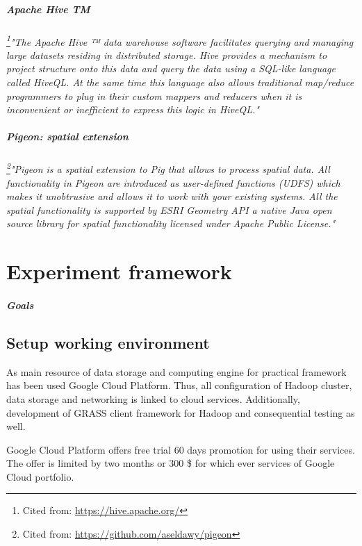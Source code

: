 \documentclass[a4paper,12pt,oneside]{report}
\begin{document}
	\paragraph{Apache Hive TM}
\textit{\footnote{Cited from: \url{https://hive.apache.org/}}"The Apache Hive ™ data warehouse software 
facilitates querying and managing large datasets residing in distributed storage. Hive provides a mechanism 
to project structure onto this data and query the data using a SQL-like language called HiveQL. At the same
time this language also allows traditional map/reduce programmers to plug in their custom mappers and 
reducers when it is inconvenient or inefficient to express this logic in HiveQL."}
	\paragraph{Pigeon: spatial extension}
\textit{\footnote{Cited from: \url{https://github.com/aseldawy/pigeon}}"Pigeon is a spatial extension to 
Pig that allows to process spatial data. All functionality in Pigeon are introduced as user-defined 
functions (UDFS) which makes it unobtrusive and allows it to work with your existing systems. All the 
spatial functionality is supported by ESRI Geometry API a native Java open source library for spatial 
functionality licensed under Apache Public License."}



	
\newpage
\chapter*{Experiment framework}
\paragraph{Goals}


\section{Setup working environment}
As main resource of data storage and computing engine for practical framework has been used Google Cloud Platform.
 Thus, all configuration of Hadoop cluster, data storage and networking is linked to cloud services. Additionally,
  development of GRASS client framework for Hadoop and consequential testing  as well.

Google Cloud Platform offers free trial 60 days promotion for using their services. The offer is limited by two
 months or 300 \$ for which ever services of Google Cloud portfolio.
\end{document}
